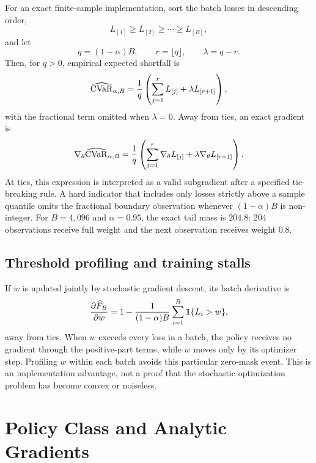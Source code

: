 For an exact finite-sample implementation, sort the batch losses in descending
order,
\[
  L_{[1]}\geq L_{[2]}\geq\cdots\geq L_{[B]},
\]
and let
\[
  q=(1-\alpha)B,\qquad r=\lfloor q\rfloor,
  \qquad \lambda=q-r.
\]
Then, for $q>0$, empirical expected shortfall is
\begin{equation}
  \widehat{\operatorname{CVaR}}_{\alpha,B}
  =\frac{1}{q}
  \left(
    \sum_{j=1}^{r}L_{[j]}+\lambda L_{[r+1]}
  \right),
  \label{eq:exact_emp_cvar}
\end{equation}
with the fractional term omitted when $\lambda=0$. Away from ties, an exact
gradient is
\begin{equation}
  \nabla_{\theta}\widehat{\operatorname{CVaR}}_{\alpha,B}
  =\frac{1}{q}
  \left(
    \sum_{j=1}^{r}\nabla_{\theta}L_{[j]}
    +\lambda\nabla_{\theta}L_{[r+1]}
  \right).
  \label{eq:exact_emp_cvar_grad}
\end{equation}
At ties, this expression is interpreted as a valid subgradient after a
specified tie-breaking rule. A hard indicator that includes only losses
strictly above a sample quantile omits the fractional boundary observation
whenever $(1-\alpha)B$ is non-integer. For $B=4,096$ and $\alpha=0.95$, the
exact tail mass is $204.8$: 204 observations receive full weight and the next
observation receives weight $0.8$.

\subsection{Threshold profiling and training stalls}

If $w$ is updated jointly by stochastic gradient descent, its batch derivative
is
\[
  \frac{\partial\widehat F_B}{\partial w}
  =1-\frac{1}{(1-\alpha)B}
  \sum_{i=1}^{B}\mathbf{1}\{L_i>w\},
\]
away from ties. When $w$ exceeds every loss in a batch, the policy receives no
gradient through the positive-part terms, while $w$ moves only by its optimizer
step. Profiling $w$ within each batch avoids this particular zero-mask event.
This is an implementation advantage, not a proof that the stochastic
optimization problem has become convex or noiseless.



\section{Policy Class and Analytic Gradients}
\label{sec:methodology}

